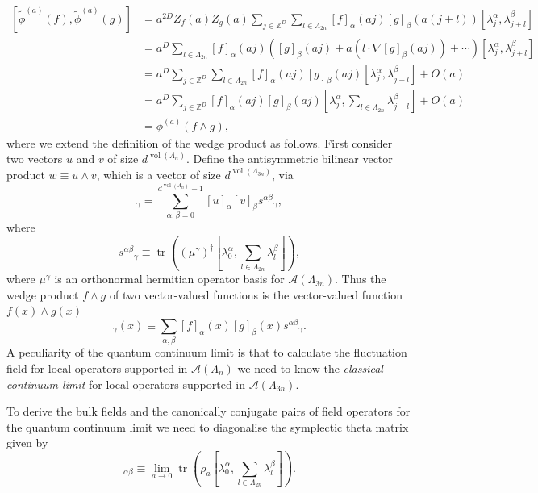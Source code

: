 \documentclass[prl,twocolumn,lengthcheck,superscriptaddress]{revtex4-1}
\newcommand{\tr}{\operatorname{tr}}
\newcommand{\vol}{\operatorname{vol}}
\theoremstyle{definition}
\theoremstyle{remark}
\begin{document}
\begin{equation}
	\begin{split}
		[\widetilde{\phi}^{(a)}(f), \widetilde{\phi}^{(a)}(g)] &= a^{2D}Z_f(a)Z_g(a)\sum_{j\in\mathbb{Z}^D}\sum_{l\in \Lambda_{2n}} [f]_\alpha(aj)[g]_\beta(a(j+l)) [\lambda_j^\alpha, \lambda_{j+l}^\beta] \\
		&= a^{D}\sum_{l\in \Lambda_{2n}} [f]_\alpha(aj)\left([g]_\beta(aj) + a \left(l \cdot \nabla [g]_\beta(aj)\right) + \cdots \right) [\lambda_j^\alpha, \lambda_{j+l}^\beta] \\
		&= a^{D}\sum_{j\in\mathbb{Z}^D}\sum_{l\in \Lambda_{2n}} [f]_\alpha(aj)[g]_\beta(aj) [\lambda_j^\alpha, \lambda_{j+l}^\beta] + O(a) \\
		&= a^{D}\sum_{j\in\mathbb{Z}^D} [f]_\alpha(aj)[g]_\beta(aj) \left[\lambda_j^\alpha, \sum_{l\in \Lambda_{2n}}\lambda_{j+l}^\beta\right] + O(a) \\
		&= \phi^{(a)}(f\wedge g),
	\end{split}
\end{equation} 
where we extend the definition of the wedge product as follows. First consider two vectors $u$ and $v$ of size $d^{\vol(\Lambda_n)}$.  Define the antisymmetric bilinear vector product $w \equiv u\wedge v$, which is a vector of size $d^{\vol(\Lambda_{3n})}$, via 
\begin{equation}
[u\wedge v]_{\gamma} = \sum_{\alpha,\beta=0}^{d^{\vol(\Lambda_n)}-1}[u]_\alpha[v]_\beta {s^{\alpha\beta}}_\gamma,
\end{equation} 
where
\begin{equation}
	{s^{\alpha\beta}}_\gamma \equiv \tr\left(({\mu^\gamma})^\dag   \left[\lambda^\alpha_0, \sum_{l\in \Lambda_{2n}}\lambda_{l}^\beta\right]\right),
\end{equation}
where ${\mu^\gamma}$ is an orthonormal hermitian operator basis for $\mathcal{A}(\Lambda_{3n})$.
Thus the wedge product $f\wedge g$ of two vector-valued functions is the vector-valued function $f(x)\wedge g(x)$
\begin{equation}
	[f\wedge g]_\gamma(x) \equiv \sum_{\alpha,\beta} [f]_\alpha(x)[g]_\beta(x) {s^{\alpha\beta}}_\gamma.
\end{equation}
A peculiarity of the quantum continuum limit is that to calculate the fluctuation field for local operators supported in $\mathcal{A}(\Lambda_n)$ we need to know the \emph{classical continuum limit} for local operators supported in $\mathcal{A}(\Lambda_{3n})$.

To derive the bulk fields and the canonically conjugate pairs of field operators for the quantum continuum limit we need to diagonalise the symplectic theta matrix given by
\begin{equation}
	[\Theta]_{\alpha\beta}  \equiv \lim_{a\rightarrow 0} \tr\left(\rho_a \left[\lambda^\alpha_0, \sum_{l\in \Lambda_{2n}}\lambda_{l}^\beta\right] \right).
\end{equation}
\end{document}
